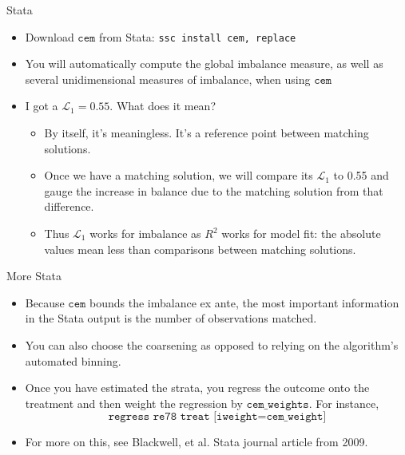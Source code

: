 \documentclass{beamer}
\begin{document}
\begin{frame}{Stata}
	
	\begin{itemize}
	\item Download $\texttt{cem}$ from Stata:  \texttt{ssc install cem, replace}
	\item You will automatically compute the global imbalance measure, as well as several unidimensional measures of imbalance, when using $\texttt{cem}$
	\item I got a $\mathcal{L}_1=0.55$.  What does it mean?
		\begin{itemize}
		\item By itself, it's meaningless.  It's a reference point between matching solutions.
		\item Once we have a matching solution, we will compare its $\mathcal{L}_1$ to 0.55 and gauge the increase in balance due to the matching solution from that difference.
		\item Thus $\mathcal{L}_1$ works for imbalance as $R^2$ works for model fit: the absolute values mean less than comparisons between matching solutions.
		\end{itemize}
	\end{itemize}
	
\end{frame}

\begin{frame}{More Stata}
	
	\begin{itemize}
	\item Because $\texttt{cem}$ bounds the imbalance ex ante, the most important information in the Stata output is the number of observations matched.
	\item You can also choose the coarsening as opposed to relying on the algorithm's automated binning.  
	\item Once you have estimated the strata, you regress the outcome onto the treatment and then weight the regression by $\texttt{cem_weights}$.  For instance, $$\texttt{regress re78 treat [iweight=cem\_weight]}$$
	\item For more on this, see Blackwell, et al. Stata journal article from 2009.  
	\end{itemize}
\end{frame}
\end{document}
